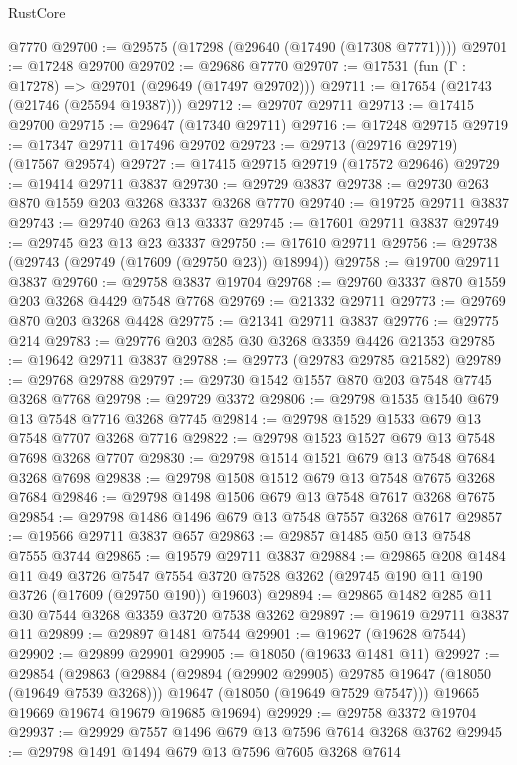 \begin{lexlean}{RustCore}
\begin{coremodule}
    @7770
@29700 := @29575 (@17298 (@29640 (@17490 (@17308 @7771))))
@29701 := @17248 @29700
@29702 := @29686 @7770
@29707 := @17531 (fun (Γ : @17278) => @29701 (@29649 (@17497 @29702)))
@29711 := @17654 (@21743 (@21746 (@25594 @19387)))
@29712 := @29707 @29711
@29713 := @17415 @29700
@29715 := @29647 (@17340 @29711)
@29716 := @17248 @29715
@29719 := @17347 @29711 @17496 @29702
@29723 := @29713 (@29716 @29719) (@17567 @29574)
@29727 := @17415 @29715 @29719 (@17572 @29646)
@29729 := @19414 @29711 @3837
@29730 := @29729 @3837
@29738 := @29730 @263 @870 @1559 @203 @3268 @3337 @3268 @7770
@29740 := @19725 @29711 @3837
@29743 := @29740 @263 @13 @3337
@29745 := @17601 @29711 @3837
@29749 := @29745 @23 @13 @23 @3337
@29750 := @17610 @29711
@29756 := @29738 (@29743 (@29749 (@17609 (@29750 @23)) @18994))
@29758 := @19700 @29711 @3837
@29760 := @29758 @3837 @19704
@29768 := @29760 @3337 @870 @1559 @203 @3268 @4429 @7548 @7768
@29769 := @21332 @29711
@29773 := @29769 @870 @203 @3268 @4428
@29775 := @21341 @29711 @3837
@29776 := @29775 @214
@29783 := @29776 @203 @285 @30 @3268 @3359 @4426 @21353
@29785 := @19642 @29711 @3837
@29788 := @29773 (@29783 @29785 @21582)
@29789 := @29768 @29788
@29797 := @29730 @1542 @1557 @870 @203 @7548 @7745 @3268 @7768
@29798 := @29729 @3372
@29806 := @29798 @1535 @1540 @679 @13 @7548 @7716 @3268 @7745
@29814 := @29798 @1529 @1533 @679 @13 @7548 @7707 @3268 @7716
@29822 := @29798 @1523 @1527 @679 @13 @7548 @7698 @3268 @7707
@29830 := @29798 @1514 @1521 @679 @13 @7548 @7684 @3268 @7698
@29838 := @29798 @1508 @1512 @679 @13 @7548 @7675 @3268 @7684
@29846 := @29798 @1498 @1506 @679 @13 @7548 @7617 @3268 @7675
@29854 := @29798 @1486 @1496 @679 @13 @7548 @7557 @3268 @7617
@29857 := @19566 @29711 @3837 @657
@29863 := @29857 @1485 @50 @13 @7548 @7555 @3744
@29865 := @19579 @29711 @3837
@29884 := @29865
    @208
    @1484
    @11
    @49
    @3726
    @7547
    @7554
    @3720
    @7528
    @3262
    (@29745 @190 @11 @190 @3726 (@17609 (@29750 @190)) @19603)
@29894 := @29865 @1482 @285 @11 @30 @7544 @3268 @3359 @3720 @7538 @3262
@29897 := @19619 @29711 @3837 @11
@29899 := @29897 @1481 @7544
@29901 := @19627 (@19628 @7544)
@29902 := @29899 @29901
@29905 := @18050 (@19633 @1481 @11)
@29927 := @29854
    (@29863
      (@29884
        (@29894 (@29902 @29905) @29785 @19647 (@18050 (@19649 @7539 @3268)))
        @19647
        (@18050 (@19649 @7529 @7547)))
      @19665
      @19669
      @19674
      @19679
      @19685
      @19694)
@29929 := @29758 @3372 @19704
@29937 := @29929 @7557 @1496 @679 @13 @7596 @7614 @3268 @3762
@29945 := @29798 @1491 @1494 @679 @13 @7596 @7605 @3268 @7614

\end{coremodule}
\end{lexlean}
